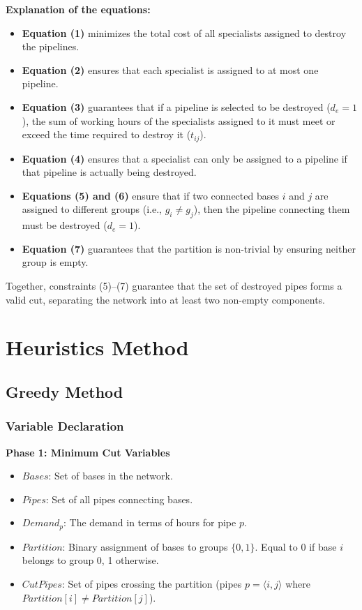 \documentclass{article}
\begin{document}
\noindent \textbf{Explanation of the equations:}
\begin{itemize}
    \item \textbf{Equation (1)} minimizes the total cost of all specialists assigned to destroy the pipelines.
    \item \textbf{Equation (2)} ensures that each specialist is assigned to at most one pipeline.
    \item \textbf{Equation (3)} guarantees that if a pipeline is selected to be destroyed ($d_e = 1$), the sum of working hours of the specialists assigned to it must meet or exceed the time required to destroy it ($t_{ij}$).
    \item \textbf{Equation (4)} ensures that a specialist can only be assigned to a pipeline if that pipeline is actually being destroyed.
    \item \textbf{Equations (5) and (6)} ensure that if two connected bases $i$ and $j$ are assigned to different groups (i.e., $g_i \neq g_j$), then the pipeline connecting them must be destroyed ($d_e = 1$).
    \item \textbf{Equation (7)} guarantees that the partition is non-trivial by ensuring neither group is empty.
\end{itemize}

\noindent Together, constraints (5)--(7) guarantee that the set of destroyed pipes forms a valid cut, separating the network into at least two non-empty components.

\section{Heuristics Method}

\subsection{Greedy Method}

\subsubsection{Variable Declaration}

\textbf{Phase 1: Minimum Cut Variables}
\begin{itemize}
    \item $Bases$: Set of bases in the network.
    \item $Pipes$: Set of all pipes connecting bases.
    \item $Demand_p$: The demand in terms of hours for pipe $p$.
    \item $Partition$: Binary assignment of bases to groups $\{0, 1\}$. Equal to 0 if base $i$ belongs to group 0, 1 otherwise.
    \item $CutPipes$: Set of pipes crossing the partition (pipes $p = \langle i,j \rangle$ where $Partition[i] \neq Partition[j]$).
\end{itemize}
\end{document}
